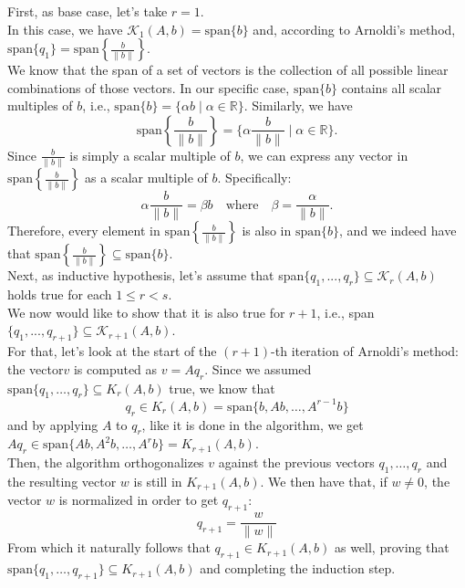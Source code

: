 \documentclass[a4paper,10pt]{article}
\begin{document}
First, as base case, let's take $r=1$.\\
In this case, we have 
$ \mathcal{K}_1(A,b) = \text{span}\{ b\} $
and, according to Arnoldi's method, 
$\text{span}\{q_1\} = \text{span}\left\{\frac{b}{\|b\|}\right\}$.\\
We know that the span of a set of vectors is the collection of all possible linear combinations of those vectors. In our specific case, \( \text{span}\{b\} \) contains all scalar multiples of \( b \), i.e., $\text{span}\{b\} = \{ \alpha b \mid \alpha \in \mathbb{R} \}$. Similarly, we have
  \[
  \text{span}\left\{\frac{b}{\|b\|}\right\} = \{ \alpha \frac{b}{\|b\|} \mid \alpha \in \mathbb{R} \}.
  \]
Since \( \frac{b}{\|b\|} \) is simply a scalar multiple of \( b \), we can express any vector in \( \text{span}\left\{\frac{b}{\|b\|}\right\} \) as a scalar multiple of \( b \). Specifically:
\[
\alpha \frac{b}{\|b\|} = \beta b \quad \text{where} \quad \beta = \frac{\alpha}{\|b\|}.
\]
Therefore, every element in \( \text{span}\left\{\frac{b}{\|b\|}\right\} \) is also in \( \text{span}\{b\} \), and we indeed have that 
$
\text{span}\left\{\frac{b}{\|b\|}\right\} \subseteq \text{span}\{b\}.
$\\

Next, as inductive hypothesis, let's assume that span$\{q_1,...,q_r\} \subseteq \mathcal{K}_r(A,b)$ holds true for each $1\leq r < s$.\\
We now would like to show that it is also true for $r+1$, i.e., span$\{q_1,...,q_{r+1}\} \subseteq \mathcal{K}_{r+1}(A,b)$.\\

For that, let's look at the start of the \( (r+1) \)-th iteration of Arnoldi's method: the vector\( v \) is computed as $v = Aq_r$.
  Since we assumed \( \text{span}\{q_1, \dots, q_r\} \subseteq K_r(A, b) \) true, we know that
  \[
  q_r \in K_r(A, b) = \text{span}\{b, Ab, \dots, A^{r-1}b\}
  \]
  and by applying \( A \) to \( q_r \), like it is done in the algorithm, we get $Aq_r \in \text{span}\{Ab, A^2b, \dots, A^r b\} = K_{r+1}(A, b)$.\\
  
Then, the algorithm orthogonalizes \( v \) against the previous vectors \( q_1, \dots, q_r \) and the resulting vector \( w \) is still in \( K_{r+1}(A, b) \). We then have that, if \( w \neq 0 \), the vector \( w \) is normalized in order to get \( q_{r+1} \):
  \[
  q_{r+1} = \frac{w}{\|w\|}
  \]
  From which it naturally follows that \( q_{r+1} \in K_{r+1}(A, b) \) as well, proving that \( \text{span}\{q_1, \dots, q_{r+1}\} \subseteq K_{r+1}(A, b) \) and completing the induction step.\\
\end{document}
